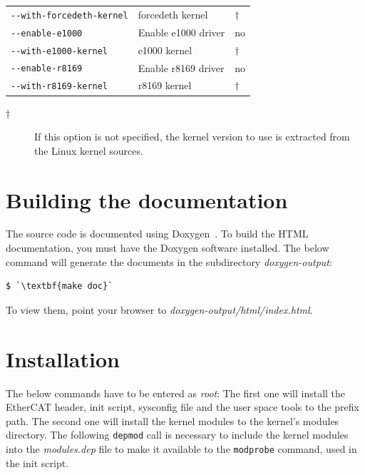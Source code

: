 \documentclass[a4paper,12pt,BCOR6mm,bibtotoc,idxtotoc]{scrbook}
\begin{document}
\begin{table}
\begin{tabular}{l|p{}|l}
\lstinline+--with-forcedeth-kernel+ & forcedeth kernel & $\dagger$\\

\lstinline+--enable-e1000+ & Enable e1000 driver & no\\

\lstinline+--with-e1000-kernel+ & e1000 kernel & $\dagger$\\

\lstinline+--enable-r8169+ & Enable r8169 driver & no\\

\lstinline+--with-r8169-kernel+ & r8169 kernel & $\dagger$\\

  \end{tabular}
  \vspace{2mm}

\begin{description}

\item[$\dagger$] If this option is not specified, the kernel version to use is
extracted from the Linux kernel sources.

\end{description}

\end{table}

\section{Building the documentation}
\label{sec:gendoc}

The source code is documented using Doxygen~\cite{doxygen}. To build the HTML
documentation, you must have the Doxygen software installed. The below command
will generate the documents in the subdirectory \textit{doxygen-output}:

\begin{lstlisting}
$ `\textbf{make doc}`
\end{lstlisting}

To view them, point your browser to \textit{doxygen-output/html/index.html}.

\section{Installation}

The below commands have to be entered as \textit{root}: The first one will
install the EtherCAT header, init script, sysconfig file and the user space
tools to the prefix path. The second one will install the kernel modules to the
kernel's modules directory. The following \lstinline+depmod+ call is necessary
to include the kernel modules into the \textit{modules.dep} file to make it
available to the \lstinline+modprobe+ command, used in the init script. 
\end{document}

